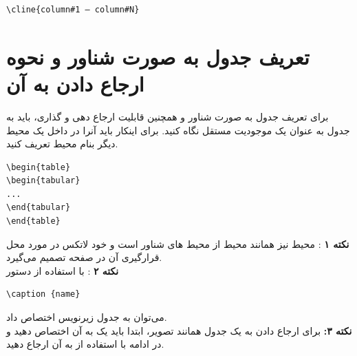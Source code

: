 \begin{latin}
\begin{lstlisting}[style=Tex]
\cline{column#1 – column#N}
\end{lstlisting}
\end{latin}

\section{تعریف جدول به صورت شناور و نحوه ارجاع دادن به آن}
برای تعریف جدول به صورت شناور و همچنین قابلیت ارجاع دهی و  گذاری، باید به جدول به عنوان یک موجودیت مستقل نگاه کنید. برای اینکار باید آنرا در داخل یک محیط دیگر بنام محیط  تعریف کنید.
\begin{latin}
\begin{lstlisting}[style=Tex]
\begin{table}
\begin{tabular}
...
\end{tabular}
\end{table}
\end{lstlisting}
\end{latin}

\noindent
\textbf{
نکته ۱} : محیط  نیز همانند محیط  از محیط های شناور است و خود لاتکس در مورد محل قرارگیری آن در صفحه تصمیم می‌گیرد.\\
\textbf{نکته ۲} : با استفاده از دستور

\begin{latin}
\begin{lstlisting}[style=Tex]
\caption {name}
\end{lstlisting}
\end{latin}

می‌توان به جدول زیرنویس اختصاص داد.\\
\textbf{نکته ۳: }برای ارجاع دادن به یک جدول همانند تصویر، ابتدا باید یک  به آن اختصاص دهید و در ادامه با استفاده از  به آن ارجاع دهید.

